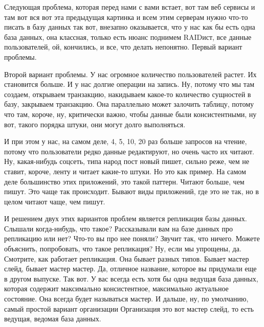 \documentclass[12pt]{article} %
\begin{document}

Следующая проблема, которая перед нами с вами встает, вот там веб сервисы и там вот вся вот эта предыдущая картинка и всем этим серверам нужно что-то писать в базу данных так вот, внезапно оказывается, что у нас как бы есть одна база данных, она классная, только есть нюанс поднимем RAIDист, все данные пользователей, ой, кончились, и все, что делать непонятно. Первый вариант проблемы.  

Второй вариант проблемы.  У нас огромное количество пользователей растет.  Их становится больше.  И у нас долгие операции на запись.  Ну, потому что мы там создаем, открываем транзакцию, накидываем какое-то количество сущностей в базу, закрываем транзакцию.  Она параллельно может залочить таблицу, потому что там, короче, ну, критически важно, чтобы данные были консистентными, ну вот, такого порядка штуки, они могут долго выполняться.  

И при этом у нас, на самом деле, 4, 5, 10, 20 раз больше запросов на чтение, потому что пользователи редко данные редактируют, но очень часто их читают. Ну, какая-нибудь соцсеть, типа народ пост новый пишет, сильно реже, чем не ставит, короче, ленту и читает какие-то штуки.  Но это как пример. На самом деле большинство этих приложений, это такой паттерн.  Читают больше, чем пишут. Это чаще так происходит.  Бывают виды приложений, где это не так, но в целом читают чаще, чем пишут.  

И решением двух этих вариантов проблем является репликация базы данных.  Слышали когда-нибудь, что такое?  Рассказывали вам на базе данных про репликацию или нет?  Что-то вы про нее поняли?  Звучит так, что ничего.  Можете объяснить, попробовать, что такое репликация?  Ну, если мы упрощены, да.  Смотрите, как работает репликация.  Она бывает разных типов. Бывает мастер слейд, бывает мастер мастер.  Да, отличное название, которое вы придумали еще в другом выпуске.  Так вот.  У вас всегда есть хотя бы одна ведущая база данных, которая содержит максимально консистентное, максимально актуальное состояние.  Она всегда будет называться мастер.  И дальше, ну, по умолчанию, самый простой вариант организации Организация это вот мастер слейд, то есть ведущая, ведомая база данных.
\end{document}
